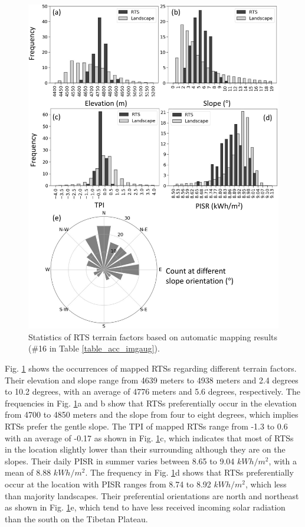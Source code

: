 \documentclass[preprint,12pt,authoryear]{elsarticle}
\begin{document}
\begin{figure}
	\centering
	\includegraphics[width=13cm]{figures/terrain_var_fig_mapped_trim.jpg}
	\caption{Statistics of RTS terrain factors based on automatic mapping results  (\#16 in Table \ref{table_acc_imgaug}). }
	\label{fig_terrain_factors}
\end{figure}

Fig. \ref{fig_terrain_factors} shows the occurrences of mapped RTSs regarding different terrain factors. Their elevation and slope range from 4639 meters to 4938 meters and 2.4 degrees to 10.2 degrees, with an average of 4776 meters and 5.6 degrees, respectively. The frequencies in Fig. \ref{fig_terrain_factors}a and b show that RTSs preferentially occur in the elevation from 4700 to 4850 meters and the slope from four to eight degrees, which implies RTSs prefer the gentle slope. The TPI of mapped RTSs range from -1.3 to 0.6 with an average of -0.17 as shown in Fig. \ref{fig_terrain_factors}c, which indicates that most of RTSs in the location slightly lower than their surrounding although they are on the slopes. Their daily PISR in summer varies between 8.65 to 9.04 $kWh/m^2$, with a mean of 8.88 $kWh/m^2$. The frequency in Fig. \ref{fig_terrain_factors}d shows that RTSs preferentially occur at the location with PISR ranges from 8.74 to 8.92 $kWh/m^2$, which less than majority landscapes.  Their preferential orientations are north and northeast as shown in Fig. \ref{fig_terrain_factors}e, which tend to have less received incoming solar radiation than the south on the Tibetan Plateau. 
\end{document}
